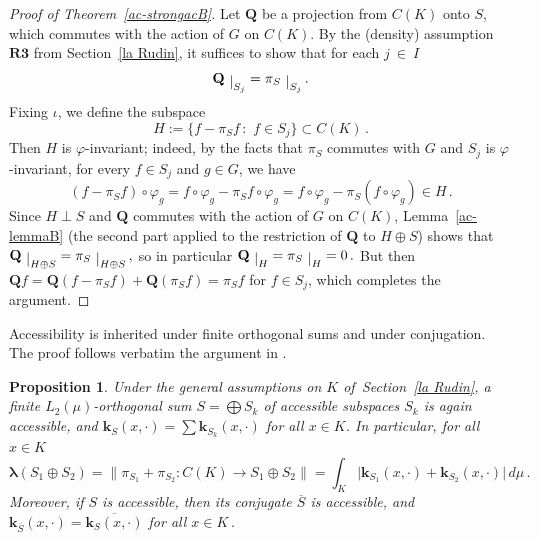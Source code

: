 \documentclass[12pt]{amsart}
\numberwithin{subsection}{section}
\newtheorem{proposition}[theorem]{Proposition}
\theoremstyle{definition}
\theoremstyle{remark}
\newcommand\restrict[1]{\raisebox{-.5ex}{ $\vert $}_{#1}}
\begin{document}
\smallskip

\begin{proof}[Proof of Theorem~\ref{ac-strongacB}]
Let $\mathbf{Q}$  be a projection from $C(K)$ onto $S$, which  commutes with the action of
$G$
on $C(K)$.
By  the (density) assumption $\mathbf{R3} $ from Section~\ref{la Rudin}, it suffices to show that for each
$j~\in~I$
\[
\mathbf{Q}\restrict{S_j} = \pi_S\restrict{S_j}\,.
\]
 Fixing $\iota$, we define the subspace
\[
 H := \big\{f-\pi_Sf\,:\,\,f\in S_j \big\} \subset C(K)\,.
\]
Then $H$ is  $\varphi$-invariant; indeed, by the facts that $\pi_S$ commutes with $G$
and $S_j $ is $\varphi$-invariant, for every   $f\in S_j $
and $g \in G$, we have
\[
(f-\pi_S f)\circ \varphi_g=f\circ \varphi_g -\pi_S f\circ \varphi_g= f\circ \varphi_g -\pi_S(f\circ \varphi_g)\in H\,.
\]
 Since $H\perp S$ and $\mathbf{Q}$ commutes with the action of $G$
 on $C(K)$,
 Lemma~\ref{ac-lemmaB} (the second part applied to the restriction  of $\mathbf{Q}$ to $H \oplus S$) shows  that
 $\mathbf{Q}\restrict{H \oplus S}=  \pi_S\restrict{H \oplus S}\,,$
  so  in particular
 $
     \mathbf{Q}\restrict{H}=  \pi_S\restrict{H} = 0\,.
     $
But then
$
   \mathbf{Q}f = \mathbf{Q}(f-\pi_S f)+ \mathbf{Q}(\pi_Sf) =   \pi_Sf
  $
  for  $f \in S_j$,
  which completes the argument.
  \end{proof}

Accessibility is inherited under finite orthogonal sums and under conjugation. The proof follows verbatim the argument in \cite[Proposition 3.2]{defant2024minimal}.

\smallskip


\begin{proposition} \label{one}
Under the general assumptions on $K$ of\, Section~\ref{la Rudin}, a finite $L_2(\mu)$-orthogonal sum $S=\bigoplus S_k$ of accessible subspaces $S_k$ is  again accessible,
  and $\mathbf{k}_S(x, \cdot) = \sum \mathbf{k}_{S_k}(x, \cdot) $ for all $x \in K$.
  In particular, for all $x \in K$
\begin{equation*}\label{integral formula sumA}
\boldsymbol{\lambda}(S_1 \oplus S_2) = \big\|\pi_{S_1} + \pi_{S_2}:C(K) \to S_1 \oplus S_2  \big\|
=
 \int_{K}\big|\mathbf{k}_{S_1}(x, \cdot) +  \mathbf{k}_{S_2}(x, \cdot)\big|\, d\mu
\,.
\end{equation*}
 Moreover,
  if $S$ is accessible, then its conjugate $\overline{S}$ is accessible, and \,
    $\mathbf{k}_{\overline{S}}(x, \cdot) = \overline{\mathbf{k}_{S}(x, \cdot)}$
    for all $x \in K$\,.
\end{proposition}
\end{document}
